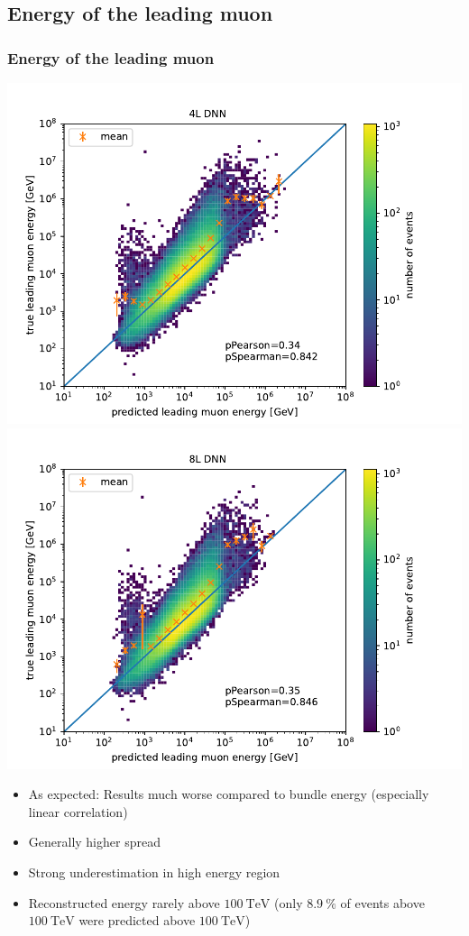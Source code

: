 \documentclass[aspectratio=1610, 9pt]{beamer}
\begin{document}
\subsection{Energy of the leading muon}
\begin{frame}
  \frametitle{Energy of the leading muon}
  \includegraphics[scale=0.45]{Plots/correlation_4L_entry.pdf}
  \includegraphics[scale=0.45]{Plots/correlation_8L_entry.pdf}
  \begin{itemize}
    \item As expected: Results much worse compared to bundle energy (especially linear correlation)
    \item Generally higher spread 
    \item Strong underestimation in high energy region
    \item Reconstructed energy rarely above $\SI{100}{\tera\electronvolt}$ (only $\SI{8,9}{\percent}$ of events above $\SI{100}{\tera\electronvolt}$ were predicted above $\SI{100}{\tera\electronvolt}$)
  \end{itemize}
\end{frame}
\end{document}
